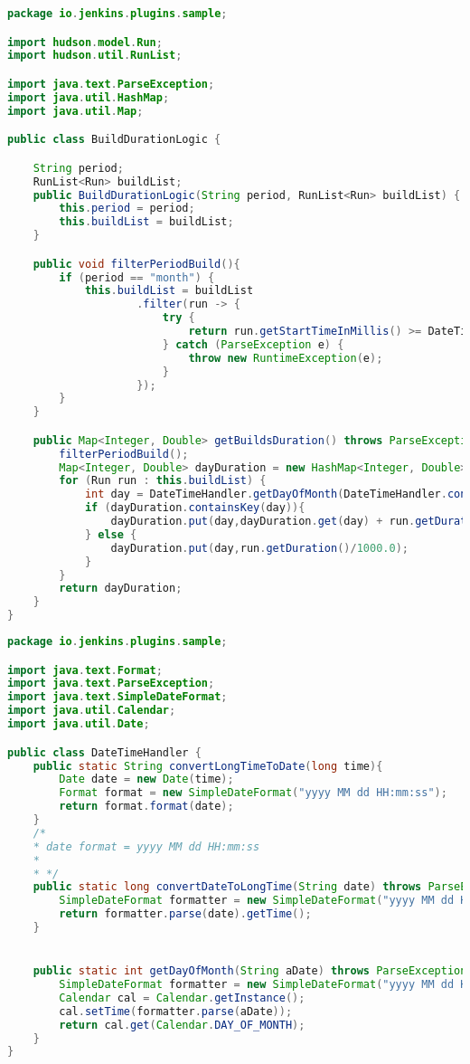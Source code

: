 \begin{lstlisting}[language=Java]
package io.jenkins.plugins.sample;

import hudson.model.Run;
import hudson.util.RunList;

import java.text.ParseException;
import java.util.HashMap;
import java.util.Map;

public class BuildDurationLogic {

    String period;
    RunList<Run> buildList;
    public BuildDurationLogic(String period, RunList<Run> buildList) {
        this.period = period;
        this.buildList = buildList;
    }

    public void filterPeriodBuild(){
        if (period == "month") {
            this.buildList = buildList
                    .filter(run -> {
                        try {
                            return run.getStartTimeInMillis() >= DateTimeHandler.convertDateToLongTime("2023 11 01 00:00:00");
                        } catch (ParseException e) {
                            throw new RuntimeException(e);
                        }
                    });
        }
    }

    public Map<Integer, Double> getBuildsDuration() throws ParseException {
        filterPeriodBuild();
        Map<Integer, Double> dayDuration = new HashMap<Integer, Double>();
        for (Run run : this.buildList) {
            int day = DateTimeHandler.getDayOfMonth(DateTimeHandler.convertLongTimeToDate(run.getStartTimeInMillis()));
            if (dayDuration.containsKey(day)){
                dayDuration.put(day,dayDuration.get(day) + run.getDuration()/1000.0);
            } else {
                dayDuration.put(day,run.getDuration()/1000.0);
            }
        }
        return dayDuration;
    }
}
\end{lstlisting}

\begin{lstlisting}[language=Java]
package io.jenkins.plugins.sample;

import java.text.Format;
import java.text.ParseException;
import java.text.SimpleDateFormat;
import java.util.Calendar;
import java.util.Date;

public class DateTimeHandler {
    public static String convertLongTimeToDate(long time){
        Date date = new Date(time);
        Format format = new SimpleDateFormat("yyyy MM dd HH:mm:ss");
        return format.format(date);
    }
    /*
    * date format = yyyy MM dd HH:mm:ss
    *
    * */
    public static long convertDateToLongTime(String date) throws ParseException {
        SimpleDateFormat formatter = new SimpleDateFormat("yyyy MM dd HH:mm:ss");
        return formatter.parse(date).getTime();
    }


    public static int getDayOfMonth(String aDate) throws ParseException {
        SimpleDateFormat formatter = new SimpleDateFormat("yyyy MM dd HH:mm:ss");
        Calendar cal = Calendar.getInstance();
        cal.setTime(formatter.parse(aDate));
        return cal.get(Calendar.DAY_OF_MONTH);
    }
}
\end{lstlisting}

